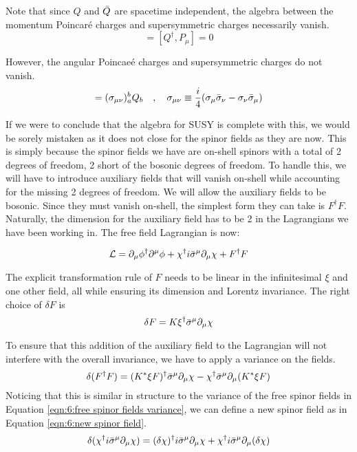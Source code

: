 Note that since $Q$ and $\Bar{Q}$ are spacetime independent, the algebra between the momentum Poincar\'{e} charges and supersymmetric charges necessarily vanish.
\begin{equation}
    [Q, P_\mu] = [Q^\dagger, P_\mu] = 0
\end{equation}

However, the angular Poincae\'{e} charges and supersymmetric charges do not vanish. 
\begin{equation}
    [Q_a, M_{\mu\nu}] = (\sigma_{\mu\nu})^b_a Q_b \quad , \quad \sigma_{\mu\nu} \equiv \frac{i}{4} (\sigma_\mu \Bar{\sigma}_\nu - \sigma_\nu \Bar{\sigma}_\mu)
\end{equation}

If we were to conclude that the algebra for SUSY is complete with this, we would be sorely mistaken as it does not close for the spinor fields as they are now. This is simply because the spinor fields we have are on-shell spinors with a total of 2 degrees of freedom, 2 short of the bosonic degrees of freedom. To handle this, we will have to introduce auxiliary fields that will vanish on-shell while accounting for the missing 2 degrees of freedom. We will allow the auxiliary fields to be bosonic. Since they must vanish on-shell, the simplest form they can take is $F^\dagger F$. Naturally, the dimension for the auxiliary field has to be 2 in the Lagrangians we have been working in. The free field Lagrangian is now:

\begin{equation}
    \mathcal{L} = \partial_\mu \phi^\dagger \partial^\mu \phi + \chi^\dagger i \Bar{\sigma}^\mu \partial_\mu \chi + F^\dagger F
    \label{eqn:6:new lagrangian}
\end{equation}

The explicit transformation rule of $F$ needs to be linear in the infinitesimal $\xi$ and one other field, all while ensuring its dimension and Lorentz invariance. The right choice of $\delta F$ is
\begin{equation}
    \delta F = K \xi^\dagger \Bar{\sigma}^\mu\partial_\mu\chi
\end{equation}

To ensure that this addition of the auxiliary field to the Lagrangian will not interfere with the overall invariance, we have to apply a variance on the fields.
\begin{equation}
    \delta(F^\dagger F) = (K^* \xi F)^\dagger \Bar{\sigma}^\mu \partial_\mu \chi - \chi^\dagger \Bar{\sigma}^\mu \partial_\mu (K^* \xi F)
    \label{eqn:6:auxiliary fields variance}
\end{equation}
Noticing that this is similar in structure to the variance of the free spinor fields in Equation \ref{eqn:6:free spinor fields variance}, we can define a new spinor field as in Equation \ref{eqn:6:new spinor field}.
\begin{equation}
    \delta(\chi^\dagger i \Bar{\sigma}^\mu \partial_\mu \chi) = (\delta \chi)^\dagger i \Bar{\sigma}^\mu \partial_\mu \chi + \chi^\dagger i \Bar{\sigma}^\mu \partial_\mu (\delta\chi)
    \label{eqn:6:free spinor fields variance}
\end{equation}

